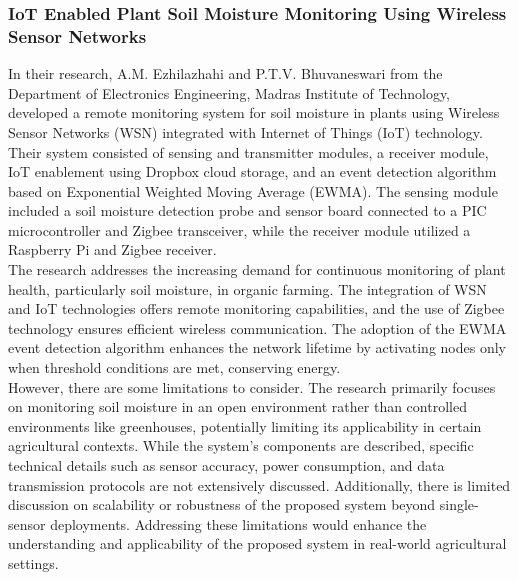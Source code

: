 \documentclass[12pt, a4paper]{article}
\begin{document}
\subsubsection{IoT Enabled Plant Soil Moisture Monitoring Using Wireless Sensor Networks}
In their research, A.M. Ezhilazhahi and P.T.V. Bhuvaneswari \cite{ezhilazhahi2017iot} from the Department of Electronics Engineering, Madras Institute of Technology, developed a remote monitoring system for soil moisture in plants using Wireless Sensor Networks (WSN) integrated with Internet of Things (IoT) technology.\\
Their system consisted of sensing and transmitter modules, a receiver module, IoT enablement using Dropbox cloud storage, and an event detection algorithm based on Exponential Weighted Moving Average (EWMA). The sensing module included a soil moisture detection probe and sensor board connected to a PIC microcontroller and Zigbee transceiver, while the receiver module utilized a Raspberry Pi and Zigbee receiver.\\
The research addresses the increasing demand for continuous monitoring of plant health, particularly soil moisture, in organic farming. The integration of WSN and IoT technologies offers remote monitoring capabilities, and the use of Zigbee technology ensures efficient wireless communication. The adoption of the EWMA event detection algorithm enhances the network lifetime by activating nodes only when threshold conditions are met, conserving energy.\\
However, there are some limitations to consider. The research primarily focuses on monitoring soil moisture in an open environment rather than controlled environments like greenhouses, potentially limiting its applicability in certain agricultural contexts. While the system's components are described, specific technical details such as sensor accuracy, power consumption, and data transmission protocols are not extensively discussed. Additionally, there is limited discussion on scalability or robustness of the proposed system beyond single-sensor deployments. Addressing these limitations would enhance the understanding and applicability of the proposed system in real-world agricultural settings.
\end{document}
